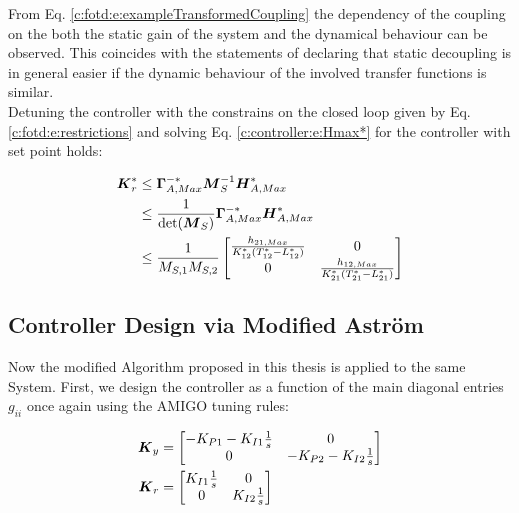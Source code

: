 From Eq. \ref{c:fotd:e:exampleTransformedCoupling} the dependency of the coupling on the both the static gain of the system and the dynamical behaviour can be observed. This coincides with the statements of \cite{Lunze2014} declaring that static decoupling is in general easier if the dynamic behaviour of the involved transfer functions is similar.\\

Detuning the controller with the constrains on the closed loop given by Eq. \ref{c:fotd:e:restrictions} and solving Eq. \ref{c:controller:e:Hmax*} for the controller with set point holds:

\begin{align}
\begin{split}
\mbox{\boldmath$K$}^*_r &\leq \mbox{\boldmath$\Gamma$}^{-*}_{A,Max}\mbox{\boldmath$M$}_S^{-1}\mbox{\boldmath$H$}^*_{A,Max} \\ 
&\leq \frac{1}{\det(\mbox{\boldmath$M$}_S)}\mbox{\boldmath$\Gamma$}^{-*}_{A,Max}\mbox{\boldmath$H$}^*_{A,Max}\\
&\leq \frac{1}{M_{S,1}M_{S,2}}
\begin{bmatrix}
\frac{h_{21,Max}}{K_{12}^* (T_{12}^* - L_{12}^*)} & 0\\
0 & \frac{h_{12,Max}}{K_{21}^* (T_{21}^* - L_{21}^*)} 
\end{bmatrix}
\end{split}
\end{align}


\subsection*{Controller Design via Modified Astr\"om}

Now the modified Algorithm proposed in this thesis is applied to the same System. First, we design the controller as a function of the main diagonal entries $g_{ii}$ once again using the AMIGO tuning rules:

\begin{align}
\begin{split}
\mbox{\boldmath$K$}_y &= \begin{bmatrix}
-K_{P1} - K_{I1}\frac{1}{s} & 0 \\
0 & -K_{P2} - K_{I2}\frac{1}{s}
\end{bmatrix} \\
\mbox{\boldmath$K$}_r &= \begin{bmatrix}
K_{I1}\frac{1}{s} & 0 \\
0 & K_{I2}\frac{1}{s}
\end{bmatrix} 
\end{split}
\label{c:fotd:e:exampleControler}
\end{align}


